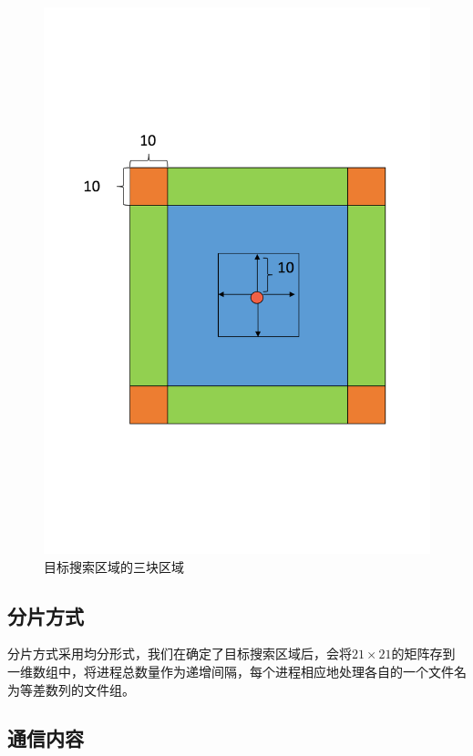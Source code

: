\documentclass[UTF8]{ctexart}
\begin{document}
\begin{figure}[!htbp]
\begin{minipage}[t]{0.45\linewidth}
    \includegraphics[width=\textwidth]{fig/fig04.pdf}
    \caption{目标搜索区域的三块区域 \label{sec3:subsec2:fg3}}
  \end{minipage}
\end{figure}


\subsection{分片方式}

分片方式采用均分形式，我们在确定了目标搜索区域后，会将$21\times21$的矩阵存到一维数组中，将进程总数量作为递增间隔，每个进程相应地处理各自的一个文件名为等差数列的文件组。

\subsection{通信内容}
\end{document}
